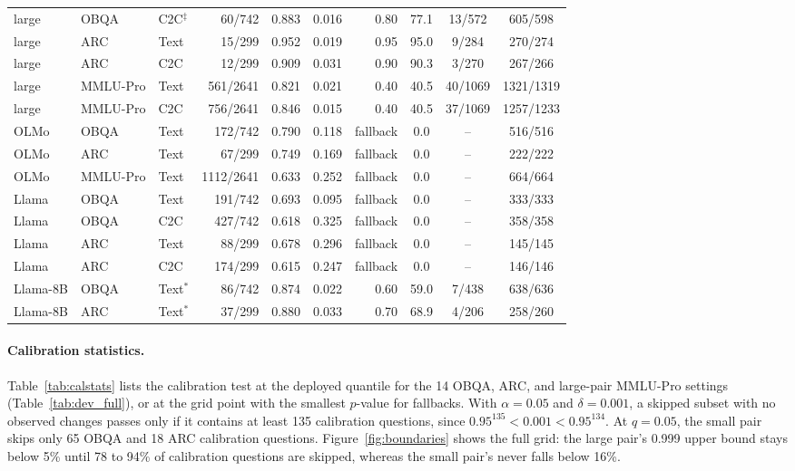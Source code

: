 \begin{table}[!htbp]
\begin{tabular*}{\linewidth}{@{}lll@{\hspace{5pt}\extracolsep{\fill}}rccrccc@{}}
large & OBQA & C2C$^\ddagger$ & 60/742 & 0.883 & 0.016 & 0.80 & 77.1 & 13/572 & 605/598\\
large & ARC & Text & 15/299 & 0.952 & 0.019 & 0.95 & 95.0 & 9/284 & 270/274\\
large & ARC & C2C & 12/299 & 0.909 & 0.031 & 0.90 & 90.3 & 3/270 & 267/266\\
large & MMLU-Pro & Text & 561/2641 & 0.821 & 0.021 & 0.40 & 40.5 & 40/1069 & 1321/1319\\
large & MMLU-Pro & C2C & 756/2641 & 0.846 & 0.015 & 0.40 & 40.5 & 37/1069 & 1257/1233\\\midrule
OLMo & OBQA & Text & 172/742 & 0.790 & 0.118 & fallback & 0.0 & -- & 516/516\\
OLMo & ARC & Text & 67/299 & 0.749 & 0.169 & fallback & 0.0 & -- & 222/222\\
OLMo & MMLU-Pro & Text & 1112/2641 & 0.633 & 0.252 & fallback & 0.0 & -- & 664/664\\\midrule
Llama & OBQA & Text & 191/742 & 0.693 & 0.095 & fallback & 0.0 & -- & 333/333\\
Llama & OBQA & C2C & 427/742 & 0.618 & 0.325 & fallback & 0.0 & -- & 358/358\\
Llama & ARC & Text & 88/299 & 0.678 & 0.296 & fallback & 0.0 & -- & 145/145\\
Llama & ARC & C2C & 174/299 & 0.615 & 0.247 & fallback & 0.0 & -- & 146/146\\\midrule
Llama-8B & OBQA & Text$^{*}$ & 86/742 & 0.874 & 0.022 & 0.60 & 59.0 & 7/438 & 638/636\\
Llama-8B & ARC & Text$^{*}$ & 37/299 & 0.880 & 0.033 & 0.70 & 68.9 & 4/206 & 258/260\\
\bottomrule
\end{tabular*}
\end{table}

\paragraph{Calibration statistics.} Table~\ref{tab:calstats} lists the calibration test at the deployed quantile for the 14 OBQA, ARC, and large-pair MMLU-Pro settings (Table~\ref{tab:dev_full}), or at the grid point with the smallest $p$-value for fallbacks. With $\alpha=0.05$ and $\delta=0.001$, a skipped subset with no observed changes passes only if it contains at least 135 calibration questions, since $0.95^{135}<0.001<0.95^{134}$. At $q=0.05$, the small pair skips only 65 OBQA and 18 ARC calibration questions. Figure~\ref{fig:boundaries} shows the full grid: the large pair's 0.999 upper bound stays below 5\% until 78 to 94\% of calibration questions are skipped, whereas the small pair's never falls below 16\%.

